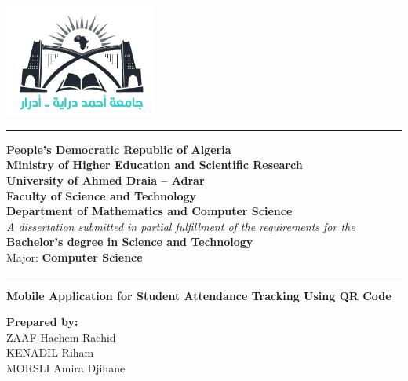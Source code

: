 \documentclass[12pt,a4paper]{report}
\begin{document}
\begin{center}

    \includegraphics[width=5cm]{images/morsli/logo-univ-.png} \\[0.5cm]

    \color{mintgreen}
    \rule{\linewidth}{2pt}
    
    \color{black}
    \vspace{0.3cm}
    \textbf{\large People's Democratic Republic of Algeria} \\
    \textbf{Ministry of Higher Education and Scientific Research} \\
    \textbf{University of Ahmed Draia – Adrar} \\
    \textbf{Faculty of Science and Technology} \\
    \textbf{Department of Mathematics and Computer Science} \\

    \vspace{0.3cm}
    \textit{A dissertation submitted in partial fulfillment of the requirements for the} \\
    \textbf{Bachelor's degree in Science and Technology} \\
    Major: \textbf{Computer Science} \\

    \vspace{0.5cm}
    {\color{mintgreen} \rule{0.8\linewidth}{1.5pt} }

    \begin{tcolorbox}[colback=mintgreen!20, colframe=mintgreen!80!black, width=0.9\linewidth, boxrule=1pt, arc=5pt, auto outer arc]
        \centering
        \Large \textbf{Mobile Application for Student Attendance Tracking Using QR Code}
    \end{tcolorbox}

    \vspace{1cm}
    \textbf{Prepared by:} \\[0.2cm]
    ZAAF Hachem Rachid \\
    KENADIL Riham \\
    MORSLI Amira Djihane \\


\end{center}
\end{document}
